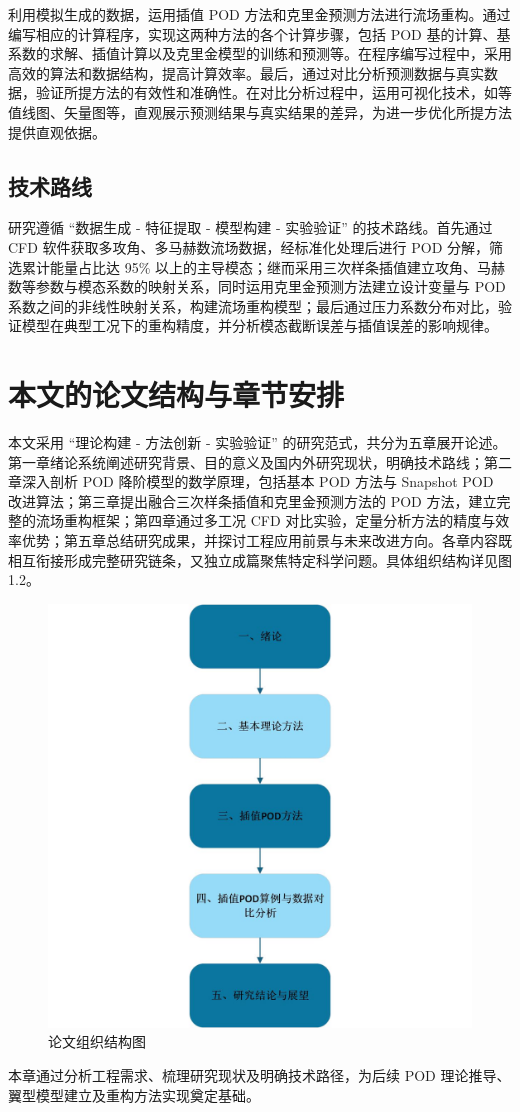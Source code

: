 利用模拟生成的数据，运用插值 POD 方法和克里金预测方法进行流场重构。通过编写相应的计算程序，实现这两种方法的各个计算步骤，包括 POD 基的计算、基系数的求解、插值计算以及克里金模型的训练和预测等。在程序编写过程中，采用高效的算法和数据结构，提高计算效率。最后，通过对比分析预测数据与真实数据，验证所提方法的有效性和准确性。在对比分析过程中，运用可视化技术，如等值线图、矢量图等，直观展示预测结果与真实结果的差异，为进一步优化所提方法提供直观依据。
\subsection{技术路线}
研究遵循 “数据生成 - 特征提取 - 模型构建 - 实验验证” 的技术路线。首先通过 CFD 软件获取多攻角、多马赫数流场数据，经标准化处理后进行 POD 分解，筛选累计能量占比达 95\% 以上的主导模态；继而采用三次样条插值建立攻角、马赫数等参数与模态系数的映射关系，同时运用克里金预测方法建立设计变量与 POD 系数之间的非线性映射关系，构建流场重构模型；最后通过压力系数分布对比，验证模型在典型工况下的重构精度，并分析模态截断误差与插值误差的影响规律。


\section{本文的论文结构与章节安排}
本文采用 “理论构建 - 方法创新 - 实验验证” 的研究范式，共分为五章展开论述。第一章绪论系统阐述研究背景、目的意义及国内外研究现状，明确技术路线；第二章深入剖析 POD 降阶模型的数学原理，包括基本 POD 方法与 Snapshot POD 改进算法；第三章提出融合三次样条插值和克里金预测方法的 POD 方法，建立完整的流场重构框架；第四章通过多工况 CFD 对比实验，定量分析方法的精度与效率优势；第五章总结研究成果，并探讨工程应用前景与未来改进方向。各章内容既相互衔接形成完整研究链条，又独立成篇聚焦特定科学问题。具体组织结构详见图1.2。
\begin{figure}[H]
    \centering
    \includegraphics[width=1.0\linewidth]{论文结构图.jpg}
    \caption{论文组织结构图}
    \label{fig:enter-label}
\end{figure}
本章通过分析工程需求、梳理研究现状及明确技术路径，为后续 POD 理论推导、翼型模型建立及重构方法实现奠定基础。